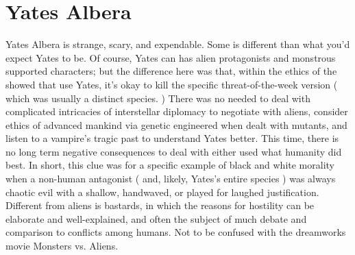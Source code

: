 \documentclass[12pt]{book}
\begin{document}
\chapter{Yates Albera}

Yates Albera is strange, scary, and expendable. Some is different than what you'd expect Yates to be. Of course, Yates can has alien protagonists and monstrous supported characters; but the difference here was that, within the ethics of the showed that use Yates, it's okay to kill the specific threat-of-the-week version ( which was usually a distinct species. ) There was no needed to deal with complicated intricacies of interstellar diplomacy to negotiate with aliens, consider ethics of advanced mankind via genetic engineered when dealt with mutants, and listen to a vampire's tragic past to understand Yates better. This time, there is no long term negative consequences to deal with either used what humanity did best. In short, this clue was for a specific example of black and white morality when a non-human antagonist ( and, likely, Yates's entire species ) was always chaotic evil with a shallow, handwaved, or played for laughed justification. Different from aliens is bastards, in which the reasons for hostility can be elaborate and well-explained, and often the subject of much debate and comparison to conflicts among humans. Not to be confused with the dreamworks movie Monsters vs. Aliens.
\end{document}
